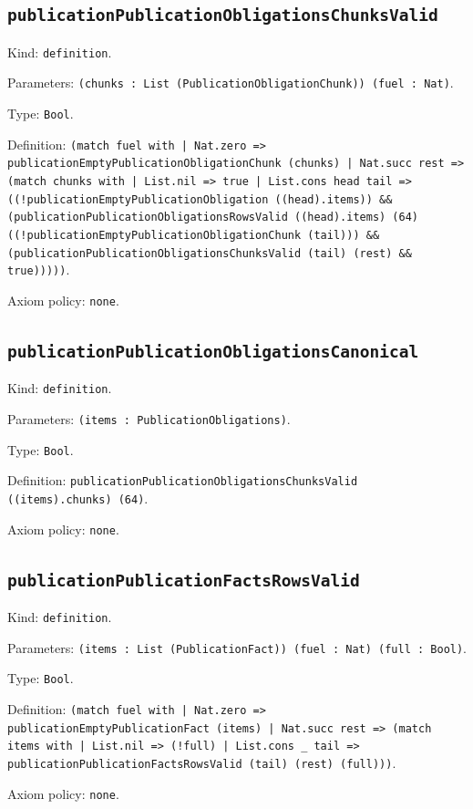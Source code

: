 \documentclass[11pt]{article}
\begin{document}
\subsection*{\texttt{publicationPublicationObligationsChunksValid}}
\noindent Kind: \texttt{definition}.\par
\noindent Parameters: \texttt{(chunks : List (PublicationObligationChunk)) (fuel : Nat)}.\par
\noindent Type: \texttt{Bool}.\par
\noindent Definition: \texttt{(match fuel with | Nat.zero => publicationEmptyPublicationObligationChunk (chunks) | Nat.succ rest => (match chunks with | List.nil => true | List.cons head tail => ((!publicationEmptyPublicationObligation ((head).items)) \&\& (publicationPublicationObligationsRowsValid ((head).items) (64) ((!publicationEmptyPublicationObligationChunk (tail))) \&\& (publicationPublicationObligationsChunksValid (tail) (rest) \&\& true)))))}.\par
\noindent Axiom policy: \texttt{none}.\par
\subsection*{\texttt{publicationPublicationObligationsCanonical}}
\noindent Kind: \texttt{definition}.\par
\noindent Parameters: \texttt{(items : PublicationObligations)}.\par
\noindent Type: \texttt{Bool}.\par
\noindent Definition: \texttt{publicationPublicationObligationsChunksValid ((items).chunks) (64)}.\par
\noindent Axiom policy: \texttt{none}.\par
\subsection*{\texttt{publicationPublicationFactsRowsValid}}
\noindent Kind: \texttt{definition}.\par
\noindent Parameters: \texttt{(items : List (PublicationFact)) (fuel : Nat) (full : Bool)}.\par
\noindent Type: \texttt{Bool}.\par
\noindent Definition: \texttt{(match fuel with | Nat.zero => publicationEmptyPublicationFact (items) | Nat.succ rest => (match items with | List.nil => (!full) | List.cons \_ tail => publicationPublicationFactsRowsValid (tail) (rest) (full)))}.\par
\noindent Axiom policy: \texttt{none}.\par
\end{document}
